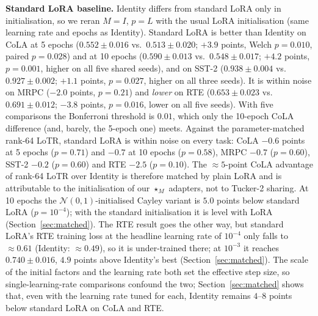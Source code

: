 \documentclass{article}
\theoremstyle{plain}
\begin{document}
\textbf{Standard LoRA baseline.}
Identity differs from standard LoRA only in initialisation, so we reran $M=I$, $p=L$ with the usual LoRA initialisation (same learning rate and epochs as Identity).
Standard LoRA is better than Identity on CoLA at 5 epochs ($0.552\pm0.016$ vs.\ $0.513\pm0.020$; $+3.9$ points, Welch $p=0.010$, paired $p=0.028$)
and at 10 epochs ($0.590\pm0.013$ vs.\ $0.548\pm0.017$; $+4.2$ points, $p=0.001$, higher on all five shared seeds), and on SST-2
($0.938\pm0.004$ vs.\ $0.927\pm0.002$; $+1.1$ points, $p=0.027$, higher on all three seeds).
It is within noise on MRPC ($-2.0$ points, $p=0.21$) and \emph{lower} on RTE ($0.653\pm0.023$ vs.\ $0.691\pm0.012$; $-3.8$ points, $p=0.016$, lower on all five seeds).
With five comparisons the Bonferroni threshold is $0.01$, which only the 10-epoch CoLA difference (and, barely, the 5-epoch one) meets.
Against the parameter-matched rank-64 LoTR, standard LoRA is within noise on every task:
CoLA $-0.6$ points at 5 epochs ($p=0.71$) and $-0.7$ at 10 epochs ($p=0.58$), MRPC $-0.7$ ($p=0.60$), SST-2 $-0.2$ ($p=0.60$) and RTE $-2.5$ ($p=0.10$).
The $\approx5$-point CoLA advantage of rank-64 LoTR over Identity is therefore matched by plain LoRA and is attributable to the initialisation of our
$\star_M$ adapters, not to Tucker-2 sharing.
At 10 epochs the $\mathcal{N}(0,1)$-initialised Cayley variant is $5.0$ points below standard LoRA ($p=10^{-4}$); with the standard initialisation it is level with LoRA (Section~\ref{sec:matched}).
The RTE result goes the other way, but standard LoRA's RTE training loss at the headline learning rate of $10^{-4}$ only falls to $\approx0.61$ (Identity: $\approx0.49$), so it is
under-trained there; at $10^{-3}$ it reaches $0.740\pm0.016$, $4.9$ points above Identity's best (Section~\ref{sec:matched}).
The scale of the initial factors and the learning rate both set the effective step size, so single-learning-rate comparisons confound the two; Section~\ref{sec:matched}
shows that, even with the learning rate tuned for each, Identity remains $4$--$8$ points below standard LoRA on CoLA and RTE.
\end{document}

